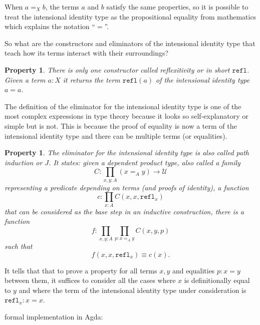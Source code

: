\documentclass[12pt,a4paper,twoside,xetex]{book}
\newcommand{\keyword}[1]{\emph{#1}\index{#1}}
\newtheorem{property}[theorem]{Property}
\newcommand{\op}[1]{\mathtt{#1}}
\begin{document}
When $a=_X b$, the terms $a$ and $b$ satisfy the  same properties, so it is possible to treat the intensional identity type as the propositional equality from mathematics which explains the notation ``$=$''. 




So what are the constructors and eliminators of the intensional identity type 
that teach how its terms interact with their surroundings?

\begin{property}\label{reflprop}
There is only one constructor called \keyword{reflexitivity} or in short 
$\op{refl}$. Given a term $a:X$ it returns the term $\op{refl}(a)$ of the 
intensional identity type  $a = a$. 
\end{property}

The definition of the eliminator for the intensional identity type is one of 
the most complex expressions in type theory because it looks so self-explanatory 
or simple but is not. This is because the proof of equality is now a term of 
the intensional identity type and there can be multiple terms (or equalities). 

\begin{property}\label{pathindprop}
The eliminator for the intensional identity type is also called \keyword{path 
induction} or $J$. It states: given a dependent product type, also called a 
family
$$C : \prod_{x,y:A} (x =_A y) \rightarrow \mathcal{U}$$
representing a predicate depending on terms (and proofs of identity), a 
function $$c:\prod_{x:A} C(x,x,\op{refl}_x)$$ that can be considered as the base 
step in an inductive construction, there is a function $$f: \prod_{x,y:A} 
\prod_{p:x=_Ay}C(x,y,p)$$ such that $$f(x,x,\op{refl}_x) \equiv c(x).$$
\end{property}


It tells that that to prove a property for all terms $x,y$ and equalities 
$p:x=y$ between them, it suffices to consider all the cases where $x$ is 
definitionally equal to $y$ and where the term of the intensional identity type 
under consideration is $\op{refl}_x : x = x$.

formal implementation in  Agda:  

\end{document}
